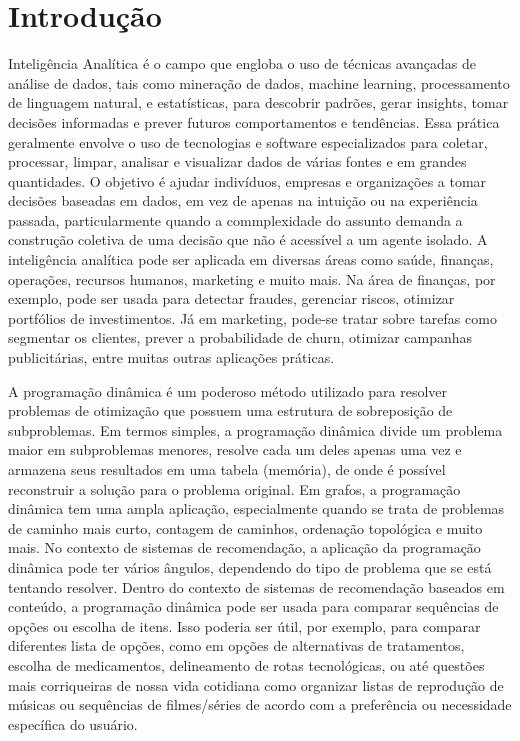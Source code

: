 \section{Introdução}
Inteligência Analítica é o campo que engloba o uso de técnicas avançadas de análise de dados, tais como mineração de dados, machine learning, processamento de linguagem natural, e estatísticas, para descobrir padrões, gerar insights, tomar decisões informadas e prever futuros comportamentos e tendências. Essa prática geralmente envolve o uso de tecnologias e software especializados para coletar, processar, limpar, analisar e visualizar dados de várias fontes e em grandes quantidades. O objetivo é ajudar indivíduos, empresas e organizações a tomar decisões baseadas em dados, em vez de apenas na intuição ou na experiência passada, particularmente quando a commplexidade do assunto demanda a construção coletiva de uma decisão que não é acessível a um agente isolado. A inteligência analítica pode ser aplicada em diversas áreas como saúde, finanças, operações, recursos humanos, marketing e muito mais. Na área de finanças, por exemplo, pode ser usada para detectar fraudes, gerenciar riscos, otimizar portfólios de investimentos. Já em marketing, pode-se tratar sobre tarefas como segmentar os clientes, prever a probabilidade de churn, otimizar campanhas publicitárias, entre muitas outras aplicações práticas.

A programação dinâmica é um poderoso método utilizado para resolver problemas de otimização que possuem uma estrutura de sobreposição de subproblemas. Em termos simples, a programação dinâmica divide um problema maior em subproblemas menores, resolve cada um deles apenas uma vez e armazena seus resultados em uma tabela (memória), de onde é possível reconstruir a solução para o problema original. Em grafos, a programação dinâmica tem uma ampla aplicação, especialmente quando se trata de problemas de caminho mais curto, contagem de caminhos, ordenação topológica e muito mais. No contexto de sistemas de recomendação, a aplicação da programação dinâmica pode ter vários ângulos, dependendo do tipo de problema que se está tentando resolver. Dentro do contexto de sistemas de recomendação baseados em conteúdo, a programação dinâmica pode ser usada para comparar sequências de opções ou escolha de itens. Isso poderia ser útil, por exemplo, para comparar diferentes lista de opções, como em opções de alternativas de tratamentos, escolha de medicamentos, delineamento de rotas tecnológicas, ou até questões mais corriqueiras de nossa vida cotidiana como organizar listas de reprodução de músicas ou sequências de filmes/séries de acordo com a preferência ou necessidade específica do usuário.

